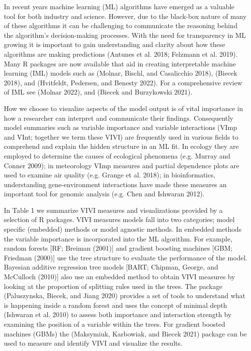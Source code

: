In recent years machine learning (ML) algorithms have emerged as a
valuable tool for both industry and science. However, due to the
black-box nature of many of these algorithms it can be challenging to
communicate the reasoning behind the algorithm's decision-making
processes. With the need for transparency in ML growing it is important
to gain understanding and clarity about how these algorithms are making
predictions (Antunes et al. 2018; Felzmann et al. 2019). Many R
packages are now available that aid in creating interpretable machine
learning (IML) models such as  (Molnar, Bischl, and Casalicchio 2018),  (Biecek 2018),
 and (Hvitfeldt, Pedersen, and Benesty 2022). For a
comprehensive review of IML see (Molnar 2022), and
(Biecek and Burzykowski 2021).

How we choose to visualize aspects of the model output is of vital
importance in how a researcher can interpret and communicate their
findings. Consequently model summaries such as variable importance and
variable interactions (VImp and VInt; together we term these VIVI) are
frequently used in various fields to comprehend and explain the hidden
structure in an ML fit. In ecology they are employed to determine the
causes of ecological phenomena (e.g. Murray and Conner 2009); in meteorology
VImp measures and partial dependence plots are used to examine air
quality (e.g. Grange et al. 2018); in bioinformatics, understanding
gene-environment interactions have made these measures an important tool
for genomic analysis (e.g. Chen and Ishwaran 2012).

In Table 1 we summarize VIVI measures and visualizations
provided by a selection of R packages. VIVI measures
models fall into two categories; model specific (embedded) methods or
model agnostic methods. In embedded methods the variable importance is
incorporated into the ML algorithm. For example, random forests {[}RF;
Breiman (2001){]} and gradient boosting machines {[}GBM;
Friedman (2000){]} use the tree structure to evaluate the performance of the
model. Bayesian additive regression tree models {[}BART; Chipman, George, and McCulloch (2010){]}
also use an embedded method to obtain VIVI measures by looking at the
proportion of splitting rules used in the trees. The package  (Paluszynska, Biecek, and Jiang 2020) provides
a set of tools to understand what is happening inside a random forest
and uses the concept of minimal depth (Ishwaran et al. 2010) to assess both importance and interaction
strength by examining the position of a variable within the trees. For
gradient boosted machines (GBMs) the  (Maksymiuk, Karbowiak, and Biecek 2021) package can be used to
measure and identify VIVI and visualize the results.

